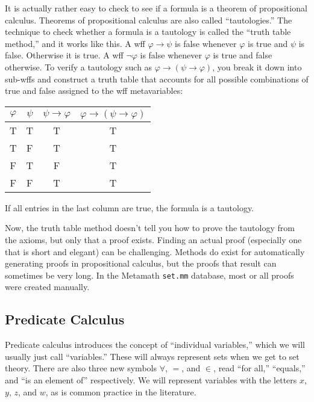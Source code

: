 It is actually rather easy to check to see if a formula is a theorem of
propositional calculus.  Theorems of propositional calculus are also called
``tautologies.''  The technique to check whether a formula is
a tautology is called the ``truth table method,'' and it
works like this.  A wff $\varphi\rightarrow\psi$ is false whenever $\varphi$ is true
and $\psi$ is false.  Otherwise it is true.  A wff $\lnot\varphi$ is false
whenever $\varphi$ is true and false otherwise. To verify a tautology such as
$\varphi\rightarrow(\psi\rightarrow \varphi)$, you break it down into sub-wffs and
construct a truth table that accounts for all possible combinations of true
and false assigned to the wff metavariables:
\begin{center}\begin{tabular}{|c|c|c|c|}\hline
\mbox{$\varphi$} & \mbox{$\psi$} & \mbox{$\psi\rightarrow\varphi$}
    & \mbox{$\varphi\rightarrow(\psi\rightarrow \varphi)$} \\ \hline \hline
              T   &  T    &      T       &        T    \\ \hline
              T   &  F    &      T       &        T    \\ \hline
              F   &  T    &      F       &        T    \\ \hline
              F   &  F    &      T       &        T    \\ \hline
\end{tabular}\end{center}
If all entries in the last column are true, the formula is a tautology.

Now, the truth table method doesn't tell you how to prove the tautology from
the axioms, but only that a proof exists.  Finding an actual proof (especially
one that is short and elegant) can be challenging.  Methods do exist for
automatically generating proofs in propositional calculus, but the proofs that
result can sometimes be very long.  In the Metamath \texttt{set.mm} database, most
or all proofs were created manually.

\subsection{Predicate Calculus}

Predicate calculus introduces the concept of
``individual variables,'' which
we will usually just call ``variables.''
These will always represent sets when we get to set theory.  There are also
three new symbols $\forall$,
$=$, and $\in$,
read ``for all,'' ``equals,'' and ``is an element of''
respectively.  We will represent variables with the letters $x$, $y$, $z$, and
$w$, as is common practice in the literature.

